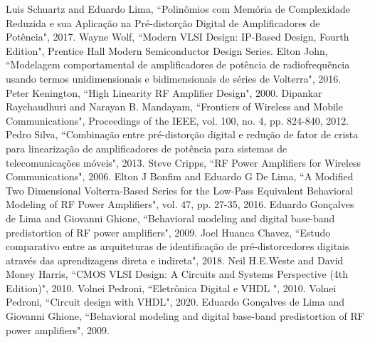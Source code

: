 \documentclass[twocolumn, a4paper]{article}
\begin{document}
\begin{thebibliography}{}
	 Luis Schuartz and Eduardo Lima, ``Polinômios com Memória de Complexidade Reduzida e sua Aplicação na Pré-distorção Digital de Amplificadores de Potência", 2017.
	 Wayne Wolf, ``Modern VLSI Design: IP-Based Design, Fourth Edition", Prentice Hall Modern Semiconductor Design Series.
	 Elton John, ``Modelagem comportamental de amplificadores de potência de radiofrequência usando termos unidimensionais e bidimensionais de séries de Volterra", 2016.
	 Peter Kenington, ``High Linearity RF Amplifier Design", 2000.
	 Dipankar Raychaudhuri and Narayan B. Mandayam, ``Frontiers of Wireless and Mobile Communications", Proceedings of the IEEE, vol. 100, no. 4, pp. 824-840, 2012.
	 Pedro Silva, ``Combinação entre pré-distorção digital e redução de fator de crista para linearização de amplificadores de potência para sistemas de telecomunicações móveis", 2013.
	 Steve Cripps, ``RF Power Amplifiers for Wireless Communications", 2006.
	 Elton J Bonfim and Eduardo G De Lima, ``A Modified Two Dimensional Volterra-Based Series for the Low-Pass Equivalent Behavioral Modeling of RF Power Amplifiers", vol. 47, pp. 27-35, 2016.
	 Eduardo Gonçalves de Lima and Giovanni Ghione, ``Behavioral modeling and digital base-band predistortion of RF power amplifiers", 2009.
	 Joel Huanca Chavez, ``Estudo comparativo entre as arquiteturas de identificação de pré-distorcedores digitais através das aprendizagens direta e indireta", 2018.
	 Neil H.E.Weste and David Money Harris, ``CMOS VLSI Design: A Circuits and Systems Perspective (4th Edition)", 2010.
	 Volnei Pedroni, ``Eletrônica Digital e VHDL ", 2010.
	 Volnei Pedroni, ``Circuit design with VHDL", 2020.
	 Eduardo Gonçalves de Lima and Giovanni Ghione, ``Behavioral modeling and digital base-band predistortion of RF power amplifiers", 2009.
\end{thebibliography}




\endgroup
	
\end{document}
